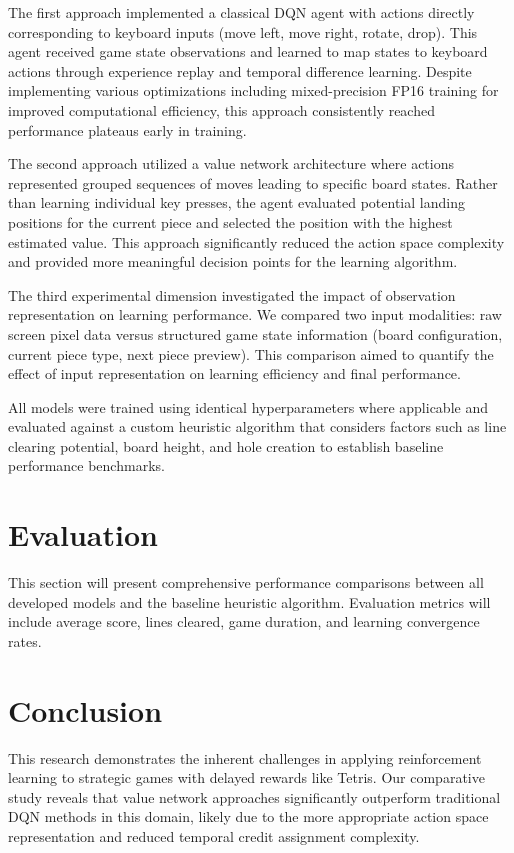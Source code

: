 \documentclass[conference]{IEEEtran}
\begin{document}
The first approach implemented a classical DQN agent with actions directly corresponding to keyboard inputs (move left, move right, rotate, drop). This agent received game state observations and learned to map states to keyboard actions through experience replay and temporal difference learning. Despite implementing various optimizations including mixed-precision FP16 training for improved computational efficiency, this approach consistently reached performance plateaus early in training.

The second approach utilized a value network architecture where actions represented grouped sequences of moves leading to specific board states. Rather than learning individual key presses, the agent evaluated potential landing positions for the current piece and selected the position with the highest estimated value. This approach significantly reduced the action space complexity and provided more meaningful decision points for the learning algorithm.

The third experimental dimension investigated the impact of observation representation on learning performance. We compared two input modalities: raw screen pixel data versus structured game state information (board configuration, current piece type, next piece preview). This comparison aimed to quantify the effect of input representation on learning efficiency and final performance.

All models were trained using identical hyperparameters where applicable and evaluated against a custom heuristic algorithm that considers factors such as line clearing potential, board height, and hole creation to establish baseline performance benchmarks.

\section{Evaluation}

This section will present comprehensive performance comparisons between all developed models and the baseline heuristic algorithm. Evaluation metrics will include average score, lines cleared, game duration, and learning convergence rates.

\section{Conclusion}

This research demonstrates the inherent challenges in applying reinforcement learning to strategic games with delayed rewards like Tetris. Our comparative study reveals that value network approaches significantly outperform traditional DQN methods in this domain, likely due to the more appropriate action space representation and reduced temporal credit assignment complexity.
\end{document}
